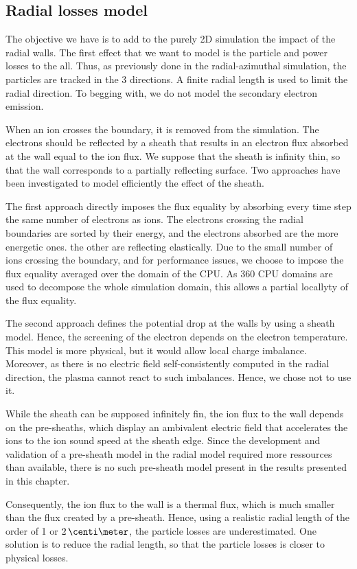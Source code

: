 \subsection{Radial losses model} \label{subsec-fakeR}

The objective we have is to add to the purely \ac{2D} simulation the impact of the radial walls.
The first effect that we want to model is the particle and power losses to the all.
Thus, as previously done in the radial-azimuthal simulation, the particles are tracked in the 3 directions.
A finite radial length is used to limit the radial direction.
To begging with, we do not model the secondary electron emission.

When an ion crosses the boundary, it is removed from the simulation.
The electrons should be reflected by a sheath that results in an electron flux absorbed at the wall equal to the ion flux.
We suppose that the sheath is infinity thin, so that the wall corresponds to a partially reflecting surface.
Two approaches have been investigated to model efficiently the effect of the sheath.

The first approach directly imposes the flux equality by absorbing every time step the same number of electrons as ions.
The electrons crossing the radial boundaries are sorted by their energy, and the electrons absorbed are the more energetic ones.
the other are reflecting elastically.
Due to the small number of ions crossing the boundary, and for performance issues, we choose to impose the flux equality averaged over the domain of the CPU.
As 360 CPU domains are used to decompose the whole simulation domain, this allows a partial locallyty of the flux equality. 

The second approach defines the potential drop at the walls by  using  a sheath model.
Hence, the screening of the electron depends on the electron temperature.
This model is more physical, but it would allow local charge imbalance.
Moreover, as there is no electric field self-consistently computed in the radial direction, the plasma cannot react to such imbalances.
Hence, we chose not to use it.

\vspace{1ex}
While the sheath can be supposed infinitely fin, the ion flux to the wall depends on the pre-sheaths, which display an ambivalent electric field that accelerates the ions to the ion sound speed at the sheath edge.
Since the development and validation of a pre-sheath model in the radial model required more ressources than available, there is no such pre-sheath model present in the results presented in this chapter.

Consequently, the ion flux to the wall is a thermal flux, which is much smaller than the flux created by a pre-sheath.
Hence, using a realistic radial length  of the order of 1 or $2\,\centi\meter$, the particle losses are underestimated.
One solution is to reduce the radial length, so that the particle losses is closer to physical losses.

